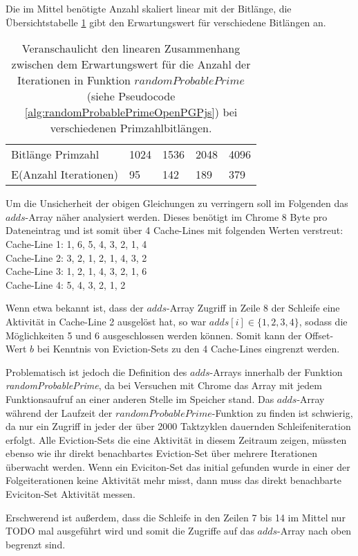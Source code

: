 Die im Mittel benötigte Anzahl skaliert linear mit der Bitlänge, die Übersichtstabelle \ref{tbl:bitLengthNumberOfIterations} gibt den Erwartungswert für verschiedene Bitlängen an.
\begin{table}[h]
\label{tbl:bitLengthNumberOfIterations}
\caption{Veranschaulicht den linearen Zusammenhang zwischen dem Erwartungswert für die Anzahl der Iterationen in Funktion $randomProbablePrime$ (siehe Pseudocode \ref{alg:randomProbablePrimeOpenPGPjs}) bei verschiedenen Primzahlbitlängen.}
\begin{tabular}{lllll}
Bitlänge Primzahl     & 1024 & 1536 & 2048 & 4096 \\
E(Anzahl Iterationen) & 95   & 142  & 189  & 379 
\end{tabular}
\end{table}

Um die Unsicherheit der obigen Gleichungen zu verringern soll im Folgenden das $adds$-Array näher analysiert werden.
Dieses benötigt im Chrome 8 Byte pro Dateneintrag und ist somit über 4 Cache-Lines mit folgenden Werten verstreut:\\
Cache-Line 1: 1, 6, 5, 4, 3, 2, 1, 4\\
Cache-Line 2: 3, 2, 1, 2, 1, 4, 3, 2\\
Cache-Line 3: 1, 2, 1, 4, 3, 2, 1, 6\\
Cache-Line 4: 5, 4, 3, 2, 1, 2

Wenn etwa bekannt ist, dass der $adds$-Array Zugriff in Zeile 8 der Schleife eine Aktivität in Cache-Line 2 ausgelöst hat, so war $adds[i] \in \{1,2,3,4\}$, sodass die Möglichkeiten 5 und 6 ausgeschlossen werden können.
Somit kann der Offset-Wert $b$ bei Kenntnis von Eviction-Sets zu den 4 Cache-Lines eingrenzt werden.

Problematisch ist jedoch die Definition des $adds$-Arrays innerhalb der Funktion \textit{randomProbablePrime}, da bei Versuchen mit Chrome das Array mit jedem Funktionsaufruf an einer anderen Stelle im Speicher stand.
Das $adds$-Array während der Laufzeit der $randomProbablePrime$-Funktion zu finden ist schwierig, da nur ein Zugriff in jeder der über 2000 Taktzyklen dauernden Schleifeniteration erfolgt.
Alle Eviction-Sets die eine Aktivität in diesem Zeitraum zeigen, müssten ebenso wie ihr direkt benachbartes Eviction-Set über mehrere Iterationen überwacht werden.
Wenn ein Eviciton-Set das initial gefunden wurde in einer der Folgeiterationen keine Aktivität mehr misst, dann muss das direkt benachbarte Eviciton-Set Aktivität messen.

Erschwerend ist außerdem, dass die Schleife in den Zeilen 7 bis 14 im Mittel nur TODO mal ausgeführt wird und somit die Zugriffe auf das $adds$-Array nach oben begrenzt sind.

